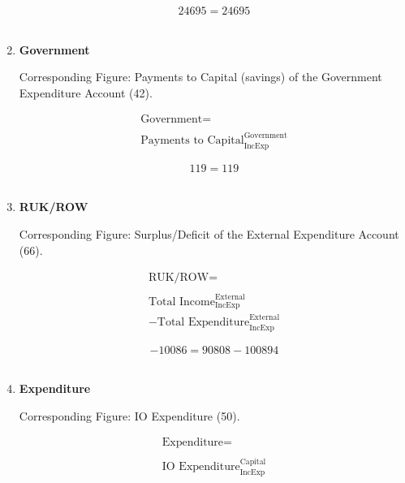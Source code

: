 \begin{enumerate}
\begin{equation} \nonumber
24695 = 24695
\end{equation}\\


\item \textbf {Government}

Corresponding Figure: Payments to Capital (savings) of the Government Expenditure Account (42).

\begin{equation}
\begin{split}
\text{Government} =  \\ \\
\text{Payments to Capital}^\text{Government}_\text{IncExp}
\end{split} \label{eq:2.5.51}
\end{equation}

\begin{equation} \nonumber
119 = 119
\end{equation}\\


\item \textbf {RUK/ROW}

Corresponding Figure: Surplus/Deficit of the External Expenditure Account (66).

\begin{equation}
\begin{split}
\text{RUK/ROW} =  \\ \\
\text{Total Income}^\text{External}_\text{IncExp}\\
-\text{Total Expenditure}^\text{External}_\text{IncExp}
\end{split} \label{eq:2.5.52}
\end{equation}

\begin{equation} \nonumber
-10086 = 90808-100894
\end{equation}\\


\pagebreak

\item \textbf {Expenditure}

Corresponding Figure: IO Expenditure (50).
	
\begin{equation}
\begin{split}
\text{Expenditure} =  \\ \\
\text{IO Expenditure}^\text{Capital}_\text{IncExp}
\end{split} \label{eq:2.5.53}
\end{equation}


\end{enumerate}
